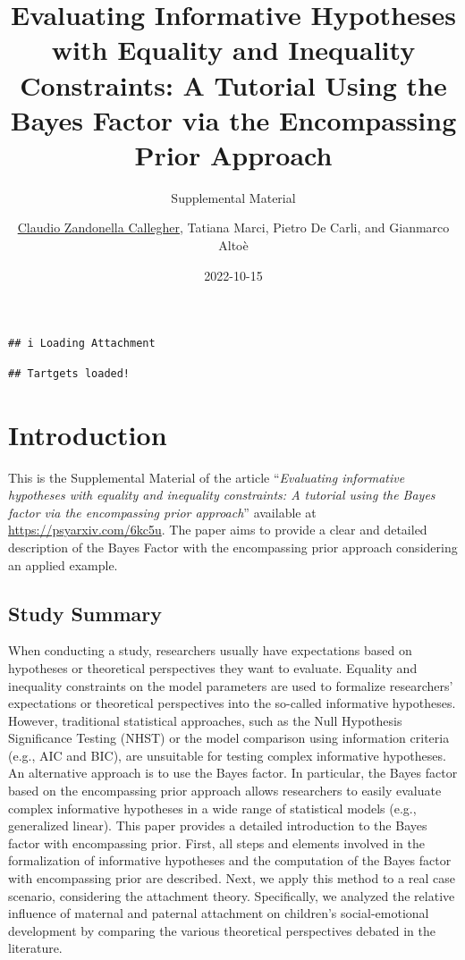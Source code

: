 \documentclass[
]{book}
\title{Evaluating Informative Hypotheses with Equality and Inequality Constraints: A Tutorial Using the Bayes Factor via the Encompassing Prior Approach}
\subtitle{Supplemental Material}
\author{\href{https://claudiozandonella.netlify.app/}{Claudio Zandonella Callegher}, Tatiana Marci, Pietro De Carli, and Gianmarco Altoè}
\date{2022-10-15}
\begin{document}
\maketitle

{
\setcounter{tocdepth}{1}
\tableofcontents
}
\begin{verbatim}
## i Loading Attachment
\end{verbatim}

\begin{verbatim}
## Tartgets loaded!
\end{verbatim}

\hypertarget{introduction}{%
\chapter*{Introduction}\label{introduction}}

This is the Supplemental Material of the article ``\emph{Evaluating informative hypotheses with equality and inequality constraints: A tutorial using the Bayes factor via the encompassing prior approach}'' available at \url{https://psyarxiv.com/6kc5u}. The paper aims to provide a clear and detailed description of the Bayes Factor with the encompassing prior approach considering an applied example.

\hypertarget{study-summary}{%
\section*{Study Summary}\label{study-summary}}

When conducting a study, researchers usually have expectations based on hypotheses or theoretical perspectives they want to evaluate. Equality and inequality constraints on the model parameters are used to formalize researchers' expectations or theoretical perspectives into the so-called informative hypotheses. However, traditional statistical approaches, such as the Null Hypothesis Significance Testing (NHST) or the model comparison using information criteria (e.g., AIC and BIC), are unsuitable for testing complex informative hypotheses. An alternative approach is to use the Bayes factor. In particular, the Bayes factor based on the encompassing prior approach allows researchers to easily evaluate complex informative hypotheses in a wide range of statistical models (e.g., generalized linear). This paper provides a detailed introduction to the Bayes factor with encompassing prior. First, all steps and elements involved in the formalization of informative hypotheses and the computation of the Bayes factor with encompassing prior are described. Next, we apply this method to a real case scenario, considering the attachment theory. Specifically, we analyzed the relative influence of maternal and paternal attachment on children's social-emotional development by comparing the various theoretical perspectives debated in the literature.
\end{document}
